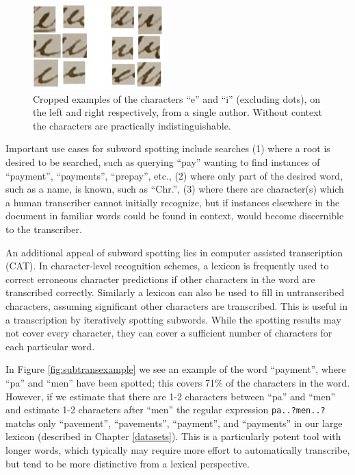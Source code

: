 \documentclass[ms,electronic,twosidetoc,letterpaper,chaptercenter,parttop,lol,lof,lot]{byumsphd}
\begin{document}
\begin{figure}
    \centering
    \includegraphics[width=0.45\textwidth]{ei}
    \caption{Cropped examples of the characters ``e'' and ``i'' (excluding dots), on the left and right respectively, from a single author. Without context the characters are practically indistinguishable.}
    \label{fig:ei}
\end{figure}

Important use cases for subword spotting include searches (1) where a root is desired to be searched, such as querying ``pay'' wanting to find instances of ``payment'', ``payments'', ``prepay'', etc., (2) where only part of the desired word, such as a name, is known, such as ``Chr.'', (3) where there are character(s) which a human transcriber cannot initially recognize, but if instances elsewhere in the document in familiar words could be found in context, would become discernible to the transcriber.

An additional appeal of subword spotting lies in computer assisted transcription (CAT). In character-level recognition schemes, a lexicon is frequently used to correct erroneous character predictions if other characters in the word are transcribed correctly. Similarly a lexicon can also be used to fill in untranscribed characters, assuming significant other characters are transcribed. This is useful in a transcription by iteratively spotting subwords. While the spotting results may not cover every character, they can cover a sufficient number of characters for each particular word.

In Figure \ref{fig:subtransexample} we see an example of the word ``payment'', where ``pa'' and ``men'' have been spotted; this covers 71\% of the characters in the word. However, if we estimate that there are 1-2 characters between ``pa'' and ``men'' and estimate 1-2 characters after ``men'' the regular expression \texttt{pa..?men..?} matchs only ``pavement'', ``pavements'', ``payment'', and ``payments'' in our large lexicon (described in Chapter \ref{datasets}). This is a particularly potent tool with longer words, which typically may require more effort to automatically transcribe, but tend to be more distinctive from a lexical perspective.
\end{document}
